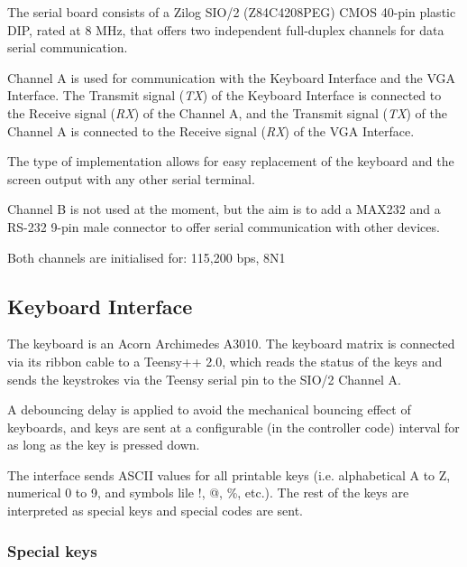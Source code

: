 \documentclass[a4paper,11pt]{article}
\begin{document}
    The serial board consists of a Zilog SIO/2 (Z84C4208PEG) CMOS 40-pin plastic
    DIP, rated at 8 MHz, that offers two independent full-duplex channels for
    data serial communication.

    Channel A is used for communication with the Keyboard Interface and the VGA
    Interface. The Transmit signal (\textit{TX}) of the Keyboard Interface is
    connected to the Receive signal (\textit{RX}) of the Channel A, and the 
    Transmit signal (\textit{TX}) of the Channel A is connected to the Receive
    signal (\textit{RX}) of the VGA Interface.

    The type of implementation allows for easy replacement of the keyboard and
    the screen output with any other serial terminal.

    Channel B is not used at the moment, but the aim is to add a MAX232 and a 
    RS-232 9-pin male connector to offer serial communication with other
    devices.

    Both channels are initialised for: 115,200 bps, 8N1

    \subsection{Keyboard Interface}

    The keyboard is an Acorn Archimedes A3010. The keyboard matrix is connected
    via its ribbon cable to a Teensy++ 2.0, which reads the status of the keys
    and sends the keystrokes via the Teensy serial pin to the SIO/2 Channel A.

    A debouncing delay is applied to avoid the mechanical bouncing effect of
    keyboards, and keys are sent at a configurable (in the controller code)
    interval for as long as the key is pressed down.

    The interface sends ASCII values for all printable keys (i.e. alphabetical
    A to Z, numerical 0 to 9, and symbols lile !, @, \%, etc.). The rest of the
    keys are interpreted as special keys and special codes are sent.

    \subsubsection{Special keys}
    
\end{document}
